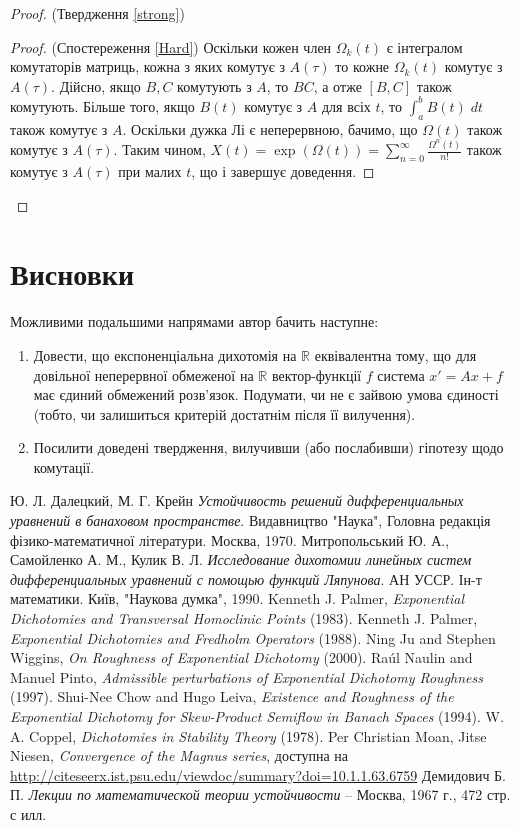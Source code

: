 \documentclass[14pt]{extarticle} %
\theoremstyle{remark}
\begin{document}
\begin{proof}{(Твердження \ref{strong})}
\begin{proof}{(Спостереження \ref{Hard})}
	Оскільки
	кожен член $\Omega_k(t)$ є інтегралом комутаторів матриць, кожна з яких комутує з $A(\tau)$ то кожне $\Omega_k(t)$ комутує з $A(\tau)$.
	Дійсно, якщо $B,C$ комутують з $A$, то $BC$, а отже $[B,C]$ також комутують. Більше того,
	якщо $B(t)$ комутує з $A$ для всіх $t$, то $\int_a^bB(t)\;dt$ також комутує з $A$. Оскільки дужка Лі є неперервною, бачимо, що
	$\Omega(t)$ також комутує з $A(\tau)$. Таким чином, $X(t)=\exp(\Omega(t))=\sum\limits_{n=0}^\infty
	\frac{\Omega^n(t)}{n!}$ також комутує з $A(\tau)$ при малих $t$, що і завершує доведення.
	\end{proof}
\end{proof}
\section{Висновки}
Можливими подальшими напрямами автор бачить наступне:\begin{enumerate}
	\item Довести, що експоненціальна дихотомія на $\mathbb{R}$ еквівалентна тому, що для довільної неперервної обмеженої на $\mathbb{R}$
		вектор-функції $f$ система $x'=Ax+f$ має єдиний обмежений розв’язок. Подумати, чи не є зайвою умова єдиності (тобто, чи залишиться
		критерій достатнім після її вилучення).
	\item Посилити доведені твердження, вилучивши (або послабивши) гіпотезу щодо комутації.
\end{enumerate}
\begin{thebibliography}{9}
Ю. Л. Далецкий, М. Г. Крейн
\emph{Устойчивость решений дифференциальных уравнений в банаховом пространстве}.
Видавництво "Наука"{}, Головна редакція фізико-математичної літератури. Москва, 1970.
Митропольський Ю. А., Самойленко А. М., Кулик В. Л.
\emph{Исследование дихотомии линейных систем дифференциальных уравнений с помощью функций Ляпунова}.
АН УССР. Ін-т математики. Київ, "Наукова думка", 1990.
	Kenneth J. Palmer, {\em Exponential Dichotomies and Transversal Homoclinic Points} (1983).
	Kenneth J. Palmer, {\em Exponential Dichotomies and Fredholm Operators} (1988).
	Ning Ju and Stephen Wiggins, {\em On Roughness of Exponential Dichotomy} (2000).
	Ra\'ul Naulin and Manuel Pinto, {\em Admissible perturbations of Exponential Dichotomy Roughness} (1997).
	Shui-Nee Chow and Hugo Leiva, {\em Existence and Roughness of the Exponential Dichotomy for Skew-Product Semiflow in Banach Spaces} (1994).
	W. A. Coppel, {\em Dichotomies in Stability Theory} (1978).
	Per Christian Moan, Jitse Niesen, {\em Convergence of the Magnus series}, доступна на 
	\url{http://citeseerx.ist.psu.edu/viewdoc/summary?doi=10.1.1.63.6759}
Демидович Б. П. \emph{Лекции по математической теории устойчивости} --
Москва, 1967 г., 472 стр. с илл.
\end{thebibliography}
\end{document}
